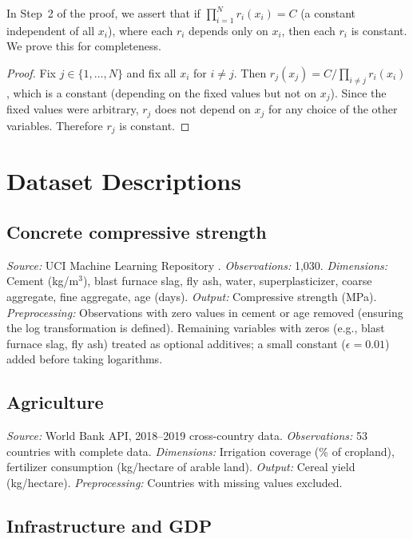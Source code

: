 \documentclass[12pt, a4paper]{article}
\theoremstyle{definition}
\theoremstyle{remark}
\begin{document}
In Step~2 of the proof, we assert that if $\prod_{i=1}^{N} r_i(x_i) = C$ (a constant independent of all $x_i$), where each $r_i$ depends only on $x_i$, then each $r_i$ is constant. We prove this for completeness.

\begin{proof}
Fix $j \in \{1, \ldots, N\}$ and fix all $x_i$ for $i \neq j$. Then $r_j(x_j) = C / \prod_{i \neq j} r_i(x_i)$, which is a constant (depending on the fixed values but not on $x_j$). Since the fixed values were arbitrary, $r_j$ does not depend on $x_j$ for any choice of the other variables. Therefore $r_j$ is constant.
\end{proof}


\section{Dataset Descriptions}\label{app:datasets}

\subsection{Concrete compressive strength}

\textit{Source:} UCI Machine Learning Repository \cite{yeh1998}. \textit{Observations:} 1,030. \textit{Dimensions:} Cement (kg/m$^3$), blast furnace slag, fly ash, water, superplasticizer, coarse aggregate, fine aggregate, age (days). \textit{Output:} Compressive strength (MPa). \textit{Preprocessing:} Observations with zero values in cement or age removed (ensuring the log transformation is defined). Remaining variables with zeros (e.g., blast furnace slag, fly ash) treated as optional additives; a small constant ($\epsilon = 0.01$) added before taking logarithms.

\subsection{Agriculture}

\textit{Source:} World Bank API, 2018--2019 cross-country data. \textit{Observations:} 53 countries with complete data. \textit{Dimensions:} Irrigation coverage (\% of cropland), fertilizer consumption (kg/hectare of arable land). \textit{Output:} Cereal yield (kg/hectare). \textit{Preprocessing:} Countries with missing values excluded.

\subsection{Infrastructure and GDP}
\end{document}
